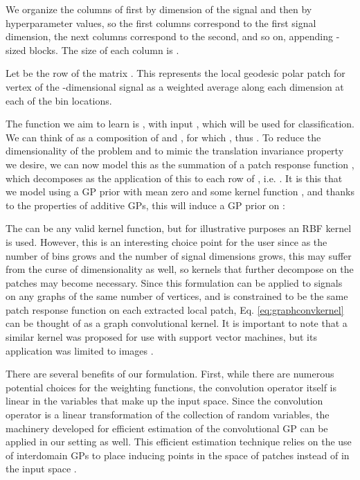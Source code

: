 \documentclass{article}
\begin{document}
We organize the columns of  first by dimension of the signal and then by hyperparameter values, so the first  columns correspond to the first signal dimension, the next  columns correspond to the second, and so on, appending  -sized blocks. The size of each column is .

Let  be the  row of the matrix . This represents the local geodesic polar patch for vertex  of the -dimensional signal  as a weighted average along each dimension at each of the  bin locations.

The function we aim to learn is , with input , which will be used for classification.  We can think of  as a composition of  and , for which , thus . To reduce the dimensionality of the problem and to mimic the translation invariance property we desire, we can now model this  as the summation of a patch response function , which decomposes as the application of this  to each row of , i.e. . It is this  that we model using a GP prior with mean zero and some kernel function , and thanks to the properties of additive GPs, this will induce a GP prior on :

The  can be any valid kernel function, but for illustrative purposes an RBF kernel is used. However, this is an interesting choice point for the user since as the number of bins grows and the number of signal dimensions grows, this may suffer from the curse of dimensionality as well, so kernels that further decompose on the patches may become necessary. Since this formulation can be applied to signals on any graphs of the same number of vertices, and  is constrained to be the same patch response function on each extracted local patch, Eq. \eqref{eq:graphconvkernel} can be thought of as a graph convolutional kernel. It is important to note that a similar kernel was proposed for use with support vector machines, but its application was limited to images \citep{convsvm}.

There are several benefits of our formulation. First, while there are numerous potential choices for the weighting functions, the convolution operator itself is linear in the variables that make up the input space. Since the convolution operator is a linear transformation of the collection of random variables, the machinery developed for efficient estimation of the convolutional GP can be applied in our setting as well. This efficient estimation technique relies on the use of interdomain GPs to place inducing points in the space of patches instead of in the input space \citep{interdomainGP}.
\end{document}
